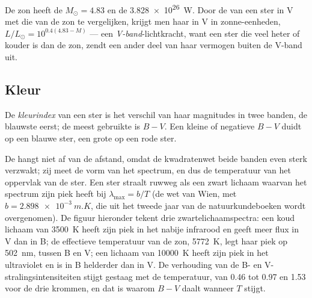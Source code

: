 De zon heeft de  $M_\odot = 4.83$ en de 
\qty{3.828e26}{W}. Door de  van een ster in V met die van de zon te
vergelijken, krijgt men haar  in V in zonne-eenheden,
$L/L_\odot = 10^{0.4(4.83 - M)}$ --- een \emph{V-band}-lichtkracht, want een ster die veel
heter of kouder is dan de zon, zendt een ander deel van haar vermogen buiten de V-band uit.

\subsection*{Kleur}

\begin{definition}[Kleurindex]\label{def:b1:observing-the-sky:colour-index}
De \emph{kleurindex} van een ster is het verschil van haar magnitudes in
twee banden, de blauwste eerst; de meest gebruikte is $B - V$. Een kleine of negatieve
$B - V$ duidt op een blauwe ster, een grote op een rode ster.
\end{definition}

De  hangt niet af van de afstand, omdat de kwadratenwet beide banden even sterk
verzwakt; zij meet de vorm van het spectrum, en dus de temperatuur van het oppervlak van de
ster. Een ster straalt ruwweg als een zwart lichaam waarvan het spectrum zijn piek heeft bij
$\lambda_\mathrm{max} = b/T$ (de wet van Wien, met $b = \qty{2.898e-3}{m.K}$, die uit het
tweede jaar van de natuurkundeboeken wordt overgenomen). De figuur hieronder tekent drie
zwartelichaamspectra: een koud lichaam van \qty{3500}{K} heeft zijn piek in het nabije
infrarood en geeft meer flux in V dan in B; de effectieve temperatuur van de zon,
\qty{5772}{K}, legt haar piek op \qty{502}{nm}, tussen B en V; een lichaam van
\qty{10000}{K} heeft zijn piek in het ultraviolet en is in B helderder dan in V. De verhouding
van de B- en V-stralingsintensiteiten stijgt gestaag met de temperatuur, van \num{0.46} tot
\num{0.97} en \num{1.53} voor de drie krommen, en dat is waarom $B - V$ daalt wanneer $T$
stijgt.

